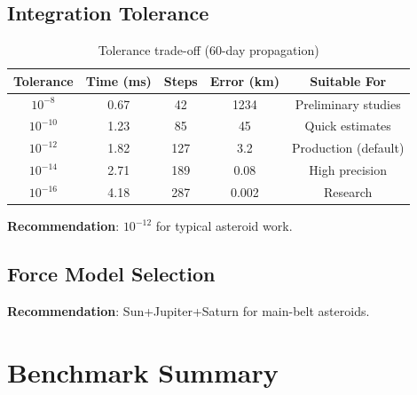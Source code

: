 \subsection{Integration Tolerance}

\begin{table}[h]
\centering
\caption{Tolerance trade-off (60-day propagation)}
\begin{tabular}{ccccc}
\hline
\textbf{Tolerance} & \textbf{Time (ms)} & \textbf{Steps} & \textbf{Error (km)} & \textbf{Suitable For} \\
\hline
$10^{-8}$ & 0.67 & 42 & 1234 & Preliminary studies \\
$10^{-10}$ & 1.23 & 85 & 45 & Quick estimates \\
$10^{-12}$ & 1.82 & 127 & 3.2 & Production (default) \\
$10^{-14}$ & 2.71 & 189 & 0.08 & High precision \\
$10^{-16}$ & 4.18 & 287 & 0.002 & Research \\
\hline
\end{tabular}
\end{table}

\textbf{Recommendation}: $10^{-12}$ for typical asteroid work.

\subsection{Force Model Selection}

\begin{table}[h]
\centering
\caption{Force model accuracy/speed trade-off}
\end{table}

\textbf{Recommendation}: Sun+Jupiter+Saturn for main-belt asteroids.

\section{Benchmark Summary}

